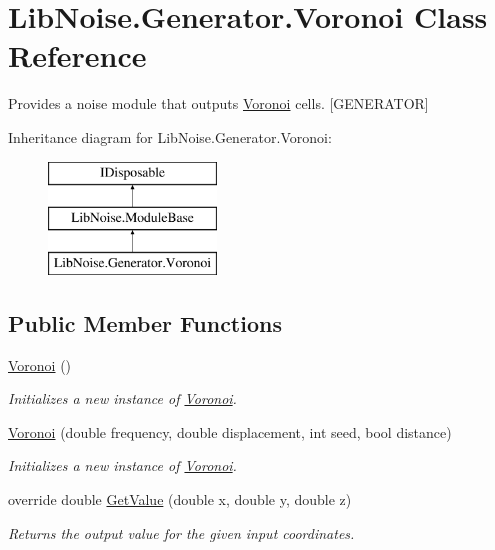 \hypertarget{class_lib_noise_1_1_generator_1_1_voronoi}{}\section{Lib\+Noise.\+Generator.\+Voronoi Class Reference}
\label{class_lib_noise_1_1_generator_1_1_voronoi}


Provides a noise module that outputs \hyperlink{class_lib_noise_1_1_generator_1_1_voronoi}{Voronoi} cells. \mbox{[}G\+E\+N\+E\+R\+A\+T\+OR\mbox{]}  


Inheritance diagram for Lib\+Noise.\+Generator.\+Voronoi\+:\begin{figure}[H]
\begin{center}
\leavevmode
\includegraphics[height=3.000000cm]{class_lib_noise_1_1_generator_1_1_voronoi}
\end{center}
\end{figure}
\subsection*{Public Member Functions}
\begin{DoxyCompactItemize}
\item 
\hyperlink{class_lib_noise_1_1_generator_1_1_voronoi_a71b16e9683fa35aaa260e495848ec73d}{Voronoi} ()
\begin{DoxyCompactList}\small\item\em Initializes a new instance of \hyperlink{class_lib_noise_1_1_generator_1_1_voronoi}{Voronoi}. \end{DoxyCompactList}\item 
\hyperlink{class_lib_noise_1_1_generator_1_1_voronoi_a4563b63be37cb9833db5e8625eefa214}{Voronoi} (double frequency, double displacement, int seed, bool distance)
\begin{DoxyCompactList}\small\item\em Initializes a new instance of \hyperlink{class_lib_noise_1_1_generator_1_1_voronoi}{Voronoi}. \end{DoxyCompactList}\item 
override double \hyperlink{class_lib_noise_1_1_generator_1_1_voronoi_a3ce1d73faa4dd781a6d6726848dd5659}{Get\+Value} (double x, double y, double z)
\begin{DoxyCompactList}\small\item\em Returns the output value for the given input coordinates. \end{DoxyCompactList}\end{DoxyCompactItemize}
